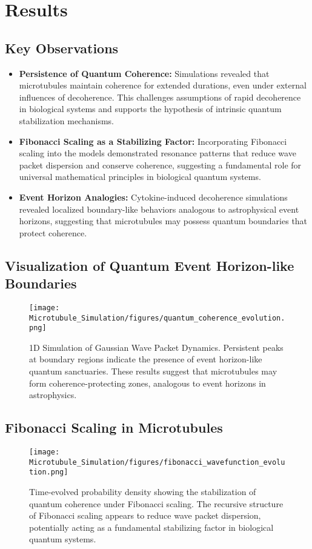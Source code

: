 \section{Results}
\subsection{Key Observations}
\begin{itemize}
    \item \textbf{Persistence of Quantum Coherence:} Simulations revealed that microtubules maintain coherence for extended durations, even under external influences of decoherence. This challenges assumptions of rapid decoherence in biological systems and supports the hypothesis of intrinsic quantum stabilization mechanisms.
    \item \textbf{Fibonacci Scaling as a Stabilizing Factor:} Incorporating Fibonacci scaling into the models demonstrated resonance patterns that reduce wave packet dispersion and conserve coherence, suggesting a fundamental role for universal mathematical principles in biological quantum systems.
    \item \textbf{Event Horizon Analogies:} Cytokine-induced decoherence simulations revealed localized boundary-like behaviors analogous to astrophysical event horizons, suggesting that microtubules may possess quantum boundaries that protect coherence.
\end{itemize}

\subsection{Visualization of Quantum Event Horizon-like Boundaries}
\begin{figure}[H]
    \centering
    \texttt{[image: Microtubule\_Simulation/figures/quantum\_coherence\_evolution.png]}
    \caption{1D Simulation of Gaussian Wave Packet Dynamics. Persistent peaks at boundary regions indicate the presence of event horizon-like quantum sanctuaries. These results suggest that microtubules may form coherence-protecting zones, analogous to event horizons in astrophysics.}
    \label{fig:event_horizon}
\end{figure}

\subsection{Fibonacci Scaling in Microtubules}
\begin{figure}[H]
    \centering
    \texttt{[image: Microtubule\_Simulation/figures/fibonacci\_wavefunction\_evolution.png]}
    \caption{Time-evolved probability density showing the stabilization of quantum coherence under Fibonacci scaling. The recursive structure of Fibonacci scaling appears to reduce wave packet dispersion, potentially acting as a fundamental stabilizing factor in biological quantum systems.}
    \label{fig:fibonacci_scaling}
\end{figure}

